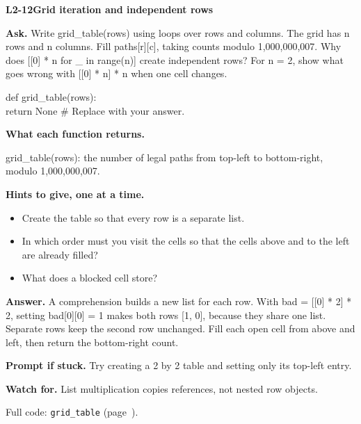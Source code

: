 \documentclass[11pt,a4paper]{article}
\begin{document}
\noindent\begin{minipage}{\textwidth}
{\color{teal}\textbf{L2-12}}\quad \textbf{Grid iteration and independent rows}\par\smallskip
\textbf{Ask.} Write grid\_table(rows) using loops over rows and columns. The grid has n rows and n columns. Fill paths[r][c], taking counts modulo 1,000,000,007. Why does [[0] * n for \_ in range(n)] create independent rows? For n = 2, show what goes wrong with [[0] * n] * n when one cell changes.\par\smallskip
\par{}\par\smallskip\noindent\colorbox{codepaper}{\parbox{\dimexpr\linewidth-2\fboxsep\relax}{\small\ttfamily\raggedright def grid\_table(rows):\\\hspace*{2.4em}return None  \# Replace with your answer.}}\par
{\small\textbf{What each function returns.}\par grid\_table(rows): the number of legal paths from top-left to bottom-right, modulo 1,000,000,007.\par }
{\small\textbf{Hints to give, one at a time.}}\begin{itemize}\item Create the table so that every row is a separate list.\item In which order must you visit the cells so that the cells above and to the left are already filled?\item What does a blocked cell store?\end{itemize}
\textbf{Answer.} A comprehension builds a new list for each row. With bad = [[0] * 2] * 2, setting bad[0][0] = 1 makes both rows [1, 0], because they share one list. Separate rows keep the second row unchanged. Fill each open cell from above and left, then return the bottom-right count.\par\smallskip
\textbf{Prompt if stuck.} Try creating a 2 by 2 table and setting only its top-left entry.\par\smallskip
\textbf{Watch for.} List multiplication copies references, not nested row objects.\par\smallskip Full code: \texttt{grid\_table} (page~\pageref{L2-code-grid_table}).
\end{minipage}\par{}\medskip
\end{document}
